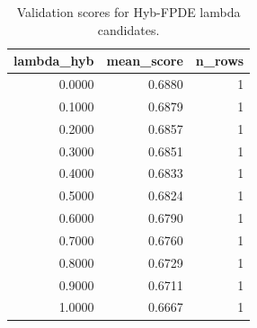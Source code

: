 \begin{table}[t]
\caption{Validation scores for Hyb-FPDE lambda candidates.}
\label{tab:lambda_distribution_computed}
\centering
\begin{tabular}{rrr}
\toprule
lambda\_hyb & mean\_score & n\_rows \\
\midrule
0.0000 & 0.6880 & 1 \\
0.1000 & 0.6879 & 1 \\
0.2000 & 0.6857 & 1 \\
0.3000 & 0.6851 & 1 \\
0.4000 & 0.6833 & 1 \\
0.5000 & 0.6824 & 1 \\
0.6000 & 0.6790 & 1 \\
0.7000 & 0.6760 & 1 \\
0.8000 & 0.6729 & 1 \\
0.9000 & 0.6711 & 1 \\
1.0000 & 0.6667 & 1 \\
\bottomrule
\end{tabular}

\end{table}
